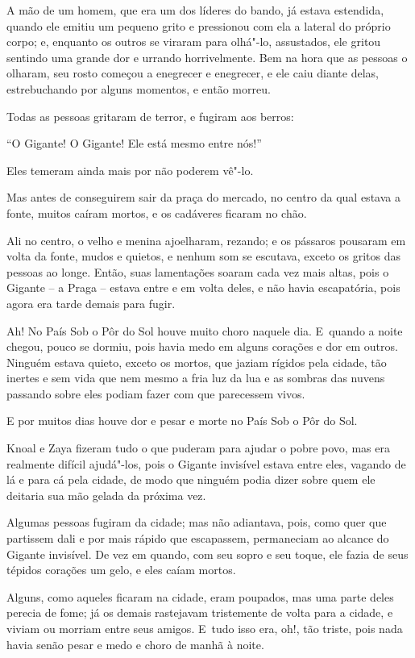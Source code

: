 A mão de um homem, que era um dos líderes do bando, já estava estendida,
quando ele emitiu um pequeno grito e pressionou com ela a lateral do
próprio corpo; e, enquanto os outros se viraram para olhá"-lo,
assustados, ele gritou sentindo uma grande dor e urrando horrivelmente.
Bem na hora que as pessoas o olharam, seu rosto começou a enegrecer e
enegrecer, e ele caiu diante delas, estrebuchando por alguns momentos, e
então morreu.

Todas as pessoas gritaram de terror, e fugiram aos berros:

``O Gigante! O Gigante! Ele está mesmo entre nós!''

Eles temeram ainda mais por não poderem vê"-lo.

Mas antes de conseguirem sair da praça do mercado, no centro da qual
estava a fonte, muitos caíram mortos, e os cadáveres ficaram no chão.

Ali no centro, o velho e menina ajoelharam, rezando; e os pássaros
pousaram em volta da fonte, mudos e quietos, e nenhum som se escutava,
exceto os gritos das pessoas ao longe. Então, suas lamentações soaram
cada vez mais altas, pois o Gigante -- a Praga -- estava entre e em
volta deles, e não havia escapatória, pois agora era tarde demais para
fugir.

Ah! No País Sob o Pôr do Sol houve muito choro naquele dia. E~quando a
noite chegou, pouco se dormiu, pois havia medo em alguns corações e dor
em outros. Ninguém estava quieto, exceto os mortos, que jaziam rígidos
pela cidade, tão inertes e sem vida que nem mesmo a fria luz da lua e as
sombras das nuvens passando sobre eles podiam fazer com que parecessem
vivos.

E por muitos dias houve dor e pesar e morte no País Sob o Pôr do Sol.

Knoal e Zaya fizeram tudo o que puderam para ajudar o pobre povo, mas
era realmente difícil ajudá"-los, pois o Gigante invisível estava entre
eles, vagando de lá e para cá pela cidade, de modo que ninguém podia
dizer sobre quem ele deitaria sua mão gelada da próxima vez.

Algumas pessoas fugiram da cidade; mas não adiantava, pois, como quer
que partissem dali e por mais rápido que escapassem, permaneciam ao
alcance do Gigante invisível. De vez em quando, com seu sopro e seu
toque, ele fazia de seus tépidos corações um gelo, e eles caíam mortos.

Alguns, como aqueles ficaram na cidade, eram poupados, mas uma parte
deles perecia de fome; já os demais rastejavam tristemente de volta para
a cidade, e viviam ou morriam entre seus amigos. E~tudo isso era, oh!,
tão triste, pois nada havia senão pesar e medo e choro de manhã à noite.

